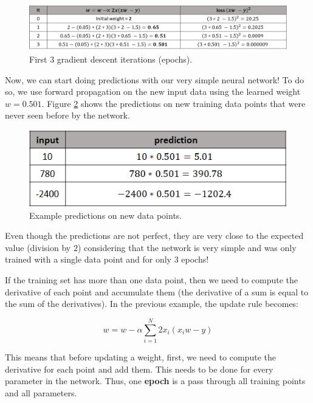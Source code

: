 \documentclass[
  11pt,
]{krantz}
\begin{document}
\begin{figure}

{\centering \includegraphics[width=1\linewidth]{images/nn_train_progress} 

}

\caption{First 3 gradient descent iterations (epochs).}\label{fig:nnTrainProgress}
\end{figure}

Now, we can start doing predictions with our very simple neural network! To do so, we use forward propagation on the new input data using the learned weight \(w=0.501\). Figure \ref{fig:nnExamplePredictions} shows the predictions on new training data points that were never seen before by the network.

\begin{figure}

{\centering \includegraphics[width=0.6\linewidth]{images/nn_example_predictions} 

}

\caption{Example predictions on new data points.}\label{fig:nnExamplePredictions}
\end{figure}

Even though the predictions are not perfect, they are very close to the expected value (division by \(2\)) considering that the network is very simple and was only trained with a single data point and for only \(3\) epochs!

If the training set has more than one data point, then we need to compute the derivative of each point and accumulate them (the derivative of a sum is equal to the sum of the derivatives). In the previous example, the update rule becomes:

\begin{equation}
  w = w - \alpha \sum_{i=1}^N{2x_i(x_i w - y)}
\end{equation}

This means that before updating a weight, first, we need to compute the derivative for each point and add them. This needs to be done for every parameter in the network. Thus, one \textbf{epoch} is a pass through all training points and all parameters.
\end{document}
